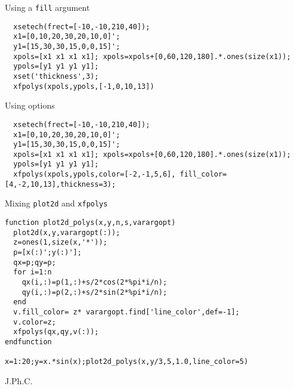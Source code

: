 \begin{examples}

\noindent Using a \verb!fill! argument
\begin{Verbatim}
  xsetech(frect=[-10,-10,210,40]);
  x1=[0,10,20,30,20,10,0]';
  y1=[15,30,30,15,0,0,15]';
  xpols=[x1 x1 x1 x1]; xpols=xpols+[0,60,120,180].*.ones(size(x1));
  ypols=[y1 y1 y1 y1];
  xset('thickness',3);
  xfpolys(xpols,ypols,[-1,0,10,13])
\end{Verbatim}

\noindent Using options

\begin{Verbatim}
  xsetech(frect=[-10,-10,210,40]);
  x1=[0,10,20,30,20,10,0]';
  y1=[15,30,30,15,0,0,15]';
  xpols=[x1 x1 x1 x1]; xpols=xpols+[0,60,120,180].*.ones(size(x1));
  ypols=[y1 y1 y1 y1];
  xfpolys(xpols,ypols,color=[-2,-1,5,6], fill_color=[4,-2,10,13],thickness=3);
\end{Verbatim}

\noindent Mixing \verb!plot2d! and \verb!xfpolys!

\begin{Verbatim}
function plot2d_polys(x,y,n,s,varargopt)
  plot2d(x,y,varargopt(:));
  z=ones(1,size(x,'*'));
  p=[x(:)';y(:)'];
  qx=p;qy=p;
  for i=1:n
    qx(i,:)=p(1,:)+s/2*cos(2*%pi*i/n);
    qy(i,:)=p(2,:)+s/2*sin(2*%pi*i/n);
  end
  v.fill_color= z* varargopt.find['line_color',def=-1];
  v.color=z;
  xfpolys(qx,qy,v(:));
endfunction

x=1:20;y=x.*sin(x);plot2d_polys(x,y/3,5,1.0,line_color=5)
\end{Verbatim}

\end{examples}

\begin{manseealso}
    
\end{manseealso}


\begin{authors}
  J.Ph.C.

\end{authors}
